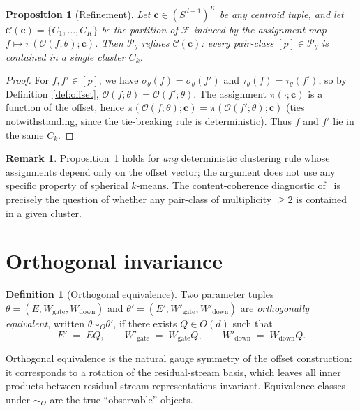 \documentclass[11pt,letterpaper]{article}
\newtheorem{proposition}[theorem]{Proposition}
\theoremstyle{definition}
\newtheorem{definition}[theorem]{Definition}
\newtheorem{remark}[theorem]{Remark}
\begin{document}
\begin{proposition}[Refinement]
\label{prop:refinement}
Let $\mathbf{c} \in (S^{d-1})^K$ be any centroid tuple, and let $\mathcal{C}(\mathbf{c}) = \{ C_1, \ldots, C_K \}$ be the partition of $\mathcal{F}$ induced by the assignment map $f \mapsto \pi(\mathcal{O}(f; \theta); \mathbf{c})$. Then $\mathcal{P}_\theta$ refines $\mathcal{C}(\mathbf{c})$: every pair-class $[p] \in \mathcal{P}_\theta$ is contained in a single cluster $C_k$.
\end{proposition}

\begin{proof}
For $f, f' \in [p]$, we have $\sigma_\theta(f) = \sigma_\theta(f')$ and $\tau_\theta(f) = \tau_\theta(f')$, so by Definition~\ref{def:offset}, $\mathcal{O}(f; \theta) = \mathcal{O}(f'; \theta)$. The assignment $\pi(\cdot; \mathbf{c})$ is a function of the offset, hence $\pi(\mathcal{O}(f; \theta); \mathbf{c}) = \pi(\mathcal{O}(f'; \theta); \mathbf{c})$ (ties notwithstanding, since the tie-breaking rule is deterministic). Thus $f$ and $f'$ lie in the same $C_k$.
\end{proof}

\begin{remark}
Proposition~\ref{prop:refinement} holds for \emph{any} deterministic clustering rule whose assignments depend only on the offset vector; the argument does not use any specific property of spherical $k$-means. The content-coherence diagnostic of~\citep{cluster_size_confound} is precisely the question of whether any pair-class of multiplicity $\geq 2$ is contained in a given cluster.
\end{remark}

\section{Orthogonal invariance}

\begin{definition}[Orthogonal equivalence]
\label{def:orth-equivalence}
Two parameter tuples $\theta = (E, W_{\mathrm{gate}}, W_{\mathrm{down}})$ and $\theta' = (E', W'_{\mathrm{gate}}, W'_{\mathrm{down}})$ are \emph{orthogonally equivalent}, written $\theta \sim_O \theta'$, if there exists $Q \in O(d)$ such that
\[
E' \;=\; E Q, \qquad W'_{\mathrm{gate}} \;=\; W_{\mathrm{gate}} Q, \qquad W'_{\mathrm{down}} \;=\; W_{\mathrm{down}} Q.
\]
\end{definition}

Orthogonal equivalence is the natural gauge symmetry of the offset construction: it corresponds to a rotation of the residual-stream basis, which leaves all inner products between residual-stream representations invariant. Equivalence classes under $\sim_O$ are the true ``observable'' objects.
\end{document}
